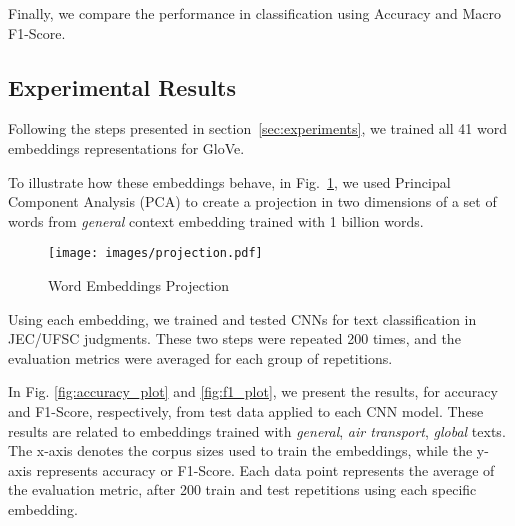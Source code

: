 Finally, we compare the performance in classification using Accuracy and Macro F1-Score.




\subsection{Experimental Results}

Following the steps presented in section~\ref{sec:experiments}, we trained all 41 word embeddings representations for GloVe. 

To illustrate how these embeddings behave, in Fig.~\ref{fig:projection}, we used Principal Component Analysis (PCA) to create a projection in two dimensions of a set of words from \textit{general} context embedding trained with 1 billion words.

\begin{figure}[htb]
    \centering
    \texttt{[image: images/projection.pdf]}
    \caption{Word Embeddings Projection}
    \label{fig:projection}
\end{figure}

Using each embedding, we trained and tested CNNs for text classification in JEC/UFSC judgments. These two steps were repeated 200 times, and the evaluation metrics were averaged for each group of repetitions.

In Fig. \ref{fig:accuracy_plot} and \ref{fig:f1_plot}, we present the results, for accuracy and F1-Score, respectively, from test data applied to each CNN model. These results are related to embeddings trained with \textit{general}, \textit{air transport}, \textit{global} texts. 
The x-axis denotes the corpus sizes used to train the embeddings, while the y-axis represents accuracy or F1-Score. Each data point represents the average of the evaluation metric, after 200 train and test repetitions using each specific embedding. %


